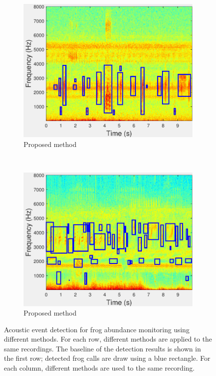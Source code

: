 \begin{figure}
                \begin{subfigure}[b]{0.35\textwidth}
       \includegraphics[width=\textwidth]{image/Ch7/AED_Jie.pdf}
                \caption{Proposed method}
        \end{subfigure}     
~
        \begin{subfigure}[b]{0.35\textwidth}
       \includegraphics[width=\textwidth]{image/Ch7/AED_Jie_2.pdf}
                \caption{Proposed method}
        \end{subfigure}                
        \caption[Acoustic event detection for frog abundance monitoring using different methods]{Acoustic event detection for frog abundance monitoring using different methods. For each row, different methods are applied to the same recordings. The baseline of the detection results is shown in the first row; detected frog calls are draw using a blue rectangle. For each column, different methods are used to the same recording.}        
        \label{fig:Ch7_AED}
\end{figure}

